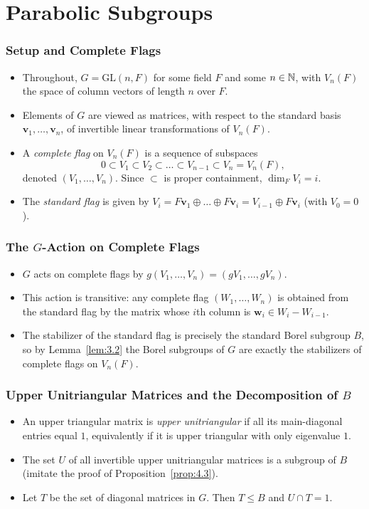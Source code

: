 \documentclass[../Odyssey_Project.tex]{subfiles}
\begin{document}
\setcounter{section}{4}
\section{Parabolic Subgroups}

\subsubsection*{Setup and Complete Flags}
\begin{itemize}
    \item Throughout, $G = \mathrm{GL}(n, F)$ for some field $F$ and some $n \in \mathbb{N}$, with $V_n(F)$ the space of column vectors of length $n$ over $F$.
    \item Elements of $G$ are viewed as matrices, with respect to the standard basis $\mathbf{v}_1, \dots, \mathbf{v}_n$, of invertible linear transformations of $V_n(F)$.
    \item A \emph{complete flag} on $V_n(F)$ is a sequence of subspaces
    \[
        0 \subset V_1 \subset V_2 \subset \dots \subset V_{n-1} \subset V_n = V_n(F),
    \]
    denoted $(V_1, \dots, V_n)$. Since $\subset$ is proper containment, $\dim_F V_i = i$.
    \item The \emph{standard flag} is given by $V_i = F\mathbf{v}_1 \oplus \dots \oplus F\mathbf{v}_i = V_{i-1} \oplus F\mathbf{v}_i$ (with $V_0 = 0$).
\end{itemize}

\subsubsection*{The $G$-Action on Complete Flags}
\begin{itemize}
    \item $G$ acts on complete flags by $g(V_1, \dots, V_n) = (gV_1, \dots, gV_n)$.
    \item This action is transitive: any complete flag $(W_1, \dots, W_n)$ is obtained from the standard flag by the matrix whose $i$th column is $\mathbf{w}_i \in W_i - W_{i-1}$.
    \item The stabilizer of the standard flag is precisely the standard Borel subgroup $B$, so by Lemma~\ref{lem:3.2} the Borel subgroups of $G$ are exactly the stabilizers of complete flags on $V_n(F)$.
\end{itemize}

\subsubsection*{Upper Unitriangular Matrices and the Decomposition of $B$}
\begin{itemize}
    \item An upper triangular matrix is \emph{upper unitriangular} if all its main-diagonal entries equal $1$, equivalently if it is upper triangular with only eigenvalue $1$.
    \item The set $U$ of all invertible upper unitriangular matrices is a subgroup of $B$ (imitate the proof of Proposition~\ref{prop:4.3}).
    \item Let $T$ be the set of diagonal matrices in $G$. Then $T \leq B$ and $U \cap T = 1$.
\end{itemize}
\end{document}
